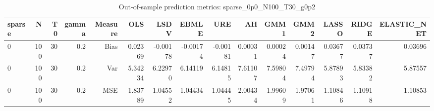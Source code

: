 \begin{table}[!htbp]\centering
\caption{Out-of-sample prediction metrics: sparse_0p0_N100_T30_g0p2}
\label{tab:table3_sparse_0p0_N100_T30_g0p2}
\begin{tabular}{lrrrrrrrrrrrrrr}
\hline
sparse & N & T0 & gamma & Measure & OLS & LSDV & EBMLE & URE & AH & GMM1 & GMM2 & LASSO & RIDGE & ELASTIC_NET \\
\hline
0 & 100 & 30 & 0.2 & Bias & 0.02369 & -0.00178 & -0.00174 & -0.00181 & 0.00031 & 0.00024 & 0.00147 & 0.03677 & 0.03737 & 0.03696 \\
0 & 100 & 30 & 0.2 & Var & 5.34234 & 6.22970 & 6.14119 & 6.14815 & 7.61107 & 7.59804 & 7.49794 & 5.87893 & 5.83382 & 5.87557 \\
0 & 100 & 30 & 0.2 & MSE & 1.83789 & 1.04552 & 1.04434 & 1.04445 & 2.00434 & 1.99609 & 1.97061 & 1.10846 & 1.10918 & 1.10853 \\
\hline
\end{tabular}
\end{table}

